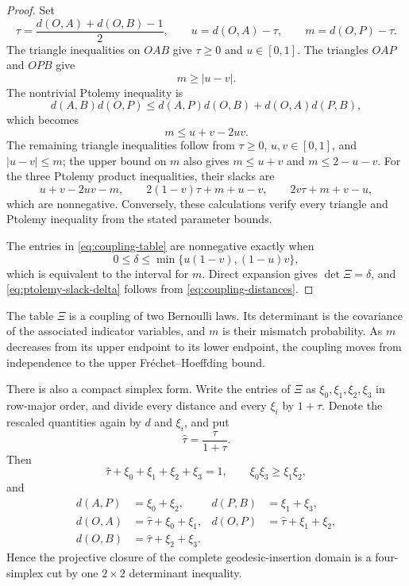 \documentclass[11pt]{amsart}
\theoremstyle{definition}
\theoremstyle{remark}
\begin{document}
\begin{proof}
Set
\[
 \tau=\frac{d(O,A)+d(O,B)-1}{2},
 \qquad
 u=d(O,A)-\tau,
 \qquad
 m=d(O,P)-\tau.
\]
The triangle inequalities on \(OAB\) give \(\tau\geq0\) and \(u\in[0,1]\). The triangles \(OAP\) and \(OPB\) give
\[
 m\geq |u-v|.
\]
The nontrivial Ptolemy inequality is
\[
 d(A,B)d(O,P)
 \leq d(A,P)d(O,B)+d(O,A)d(P,B),
\]
which becomes
\[
 m\leq u+v-2uv.
\]
The remaining triangle inequalities follow from $\tau\geq0$,
$u,v\in[0,1]$, and $|u-v|\leq m$; the upper bound on $m$ also gives
$m\leq u+v$ and $m\leq2-u-v$. For the three Ptolemy product
inequalities, their slacks are
\[
 u+v-2uv-m,
 \qquad
 2(1-v)\tau+m+u-v,
 \qquad
 2v\tau+m+v-u,
\]
which are nonnegative. Conversely, these calculations verify every
triangle and Ptolemy inequality from the stated parameter bounds.

The entries in \eqref{eq:coupling-table} are nonnegative exactly when
\[
 0\leq\delta\leq\min\{u(1-v),(1-u)v\},
\]
which is equivalent to the interval for \(m\). Direct expansion gives \(\det\Xi=\delta\), and \eqref{eq:ptolemy-slack-delta} follows from \eqref{eq:coupling-distances}.
\end{proof}

The table \(\Xi\) is a coupling of two Bernoulli laws. Its determinant is
the covariance of the associated indicator variables, and \(m\) is their
mismatch probability. As $m$ decreases from its upper endpoint to its lower endpoint, the coupling moves from independence to the upper Fr\'echet--Hoeffding bound.

There is also a compact simplex form. Write the entries of \(\Xi\) as
\(\xi_0,\xi_1,\xi_2,\xi_3\) in row-major order, and divide every distance
and every \(\xi_i\) by \(1+\tau\). Denote the rescaled quantities again by
\(d\) and \(\xi_i\), and put
\[
 \widehat\tau=\frac{\tau}{1+\tau}.
\]
Then
\begin{equation}\label{eq:simplex-chamber}
 \widehat\tau+\xi_0+\xi_1+\xi_2+\xi_3=1,
 \qquad
 \xi_0\xi_3\geq\xi_1\xi_2,
\end{equation}
and
\begin{align*}
 d(A,P)&=\xi_0+\xi_2,&
 d(P,B)&=\xi_1+\xi_3,\\
 d(O,A)&=\widehat\tau+\xi_0+\xi_1,&
 d(O,P)&=\widehat\tau+\xi_1+\xi_2,\\
 d(O,B)&=\widehat\tau+\xi_2+\xi_3.&
\end{align*}
Hence the projective closure of the complete geodesic-insertion domain is a four-simplex cut by one \(2\times2\) determinant inequality.
\end{document}
